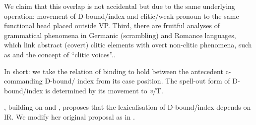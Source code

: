 \documentclass[output=paper,modfonts,nonflat
]{langsci/langscibook}
\begin{document}
\begin{itemize}
{We claim that this overlap is not accidental but due to the same underlying operation: movement of D-bound/index and clitic/weak pronoun to the same functional head placed outside VP. Third, there are fruitful analyses of grammatical phenomena in Germanic (scrambling) and Romance languages, which link abstract (covert) clitic elements with overt non-clitic phenomena, such as \cite{sportiche1996} and the concept of ``clitic voices''.}.   
\end{itemize}

In short: we take the relation of binding to hold between the antecedent c-commanding D-bound/ index from its case position. The spell-out form of D-bound/index is determined by its movement to \textit{v}/T.

\cite{nikolaeva2014}, building on \cite{chomsky1986,vikner1985,pica1987,pica1991,hestvik1992} and \cite{avrutin1994}, proposes that the lexicalisation of D-bound/index depends on IR. We modify her original proposal as in .

\end{document}
